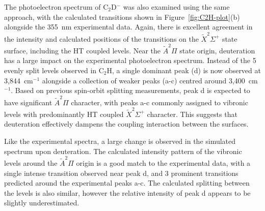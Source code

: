 \documentclass[journal=jpcafh,manuscript=article,layout=onecolumn, 12pt]{achemso}
\begin{document}
The photoelectron spectrum of C$_2$D$^-$ was also examined using the same approach, with the calculated transitions shown in Figure~\ref{fig:C2H-plot}(b) alongside the 355~nm experimental data. Again, there is excellent agreement in the intensity and calculated positions of the transitions on the $\tilde{X} ^2\Sigma^+$ state surface, including the HT coupled levels. Near the $\tilde{A} ^2\Pi$ state origin, deuteration has a large impact on the experimental photoelectron spectrum. Instead of the 5 evenly split levels observed in C$_2$H, a single dominant peak (d) is now observed at 3,844~cm$^{-1}$ alongside a collection of weaker peaks (a-c) centred around 3,400~cm$^{-1}$. Based on previous spin-orbit splitting measurements, peak d is expected to have significant $\tilde{A} ^2\Pi$ character, with peaks a-c commonly assigned to vibronic levels with predominantly HT coupled $\tilde{X} ^2\Sigma^+$ character. This suggests that deuteration effectively dampens the coupling interaction between the surfaces.

Like the experimental spectra, a large change is observed in the simulated spectrum upon deuteration. The calculated intensity pattern of the vibronic levels around the $\tilde{A} ^2\Pi$ origin is a good match to the experimental data, with a single intense transition observed near peak d, and 3 prominent transitions predicted around the experimental peaks a-c. The calculated splitting between the levels is also similar, however the relative intensity of peak d appears to be slightly underestimated. %
\end{document}

